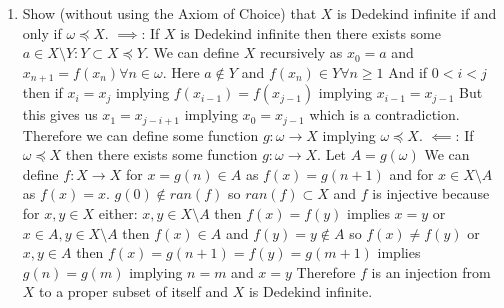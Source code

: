 \documentclass[11pt]{amsart}
\begin{document}
\begin{enumerate}
\begin{enumerate}
\vfill
\item Show (without using the Axiom of Choice) that $X$ is Dedekind infinite if and only if $\omega \preccurlyeq X$.
$\implies$: If $X$ is Dedekind infinite then there exists some $a \in X\setminus Y : Y \subset X \preceq Y$.
We can define $X$ recursively as $x_0 = a$ and $x_{n+1} = f(x_n) \forall n \in \omega$.
Here $a \notin Y$ and $f(x_n) \in Y \forall n \geq 1$
And if $0<i<j$ then if $x_i = x_j$ implying $f(x_{i-1}) = f(x_{j-1})$ implying $x_{i-1} = x_{j-1}$
But this gives us $x_1 = x_{j-i+1}$ implying $x_0 = x_{j-1}$ which is a contradiction.
Therefore we can define some function $g: \omega \rightarrow X$ implying $\omega \preceq X$.
$\impliedby$: If $\omega \preceq X$ then there exists some function $g: \omega \rightarrow X$.
Let $A = g(\omega)$
We can define $f: X \rightarrow X$ for $x = g(n) \in A$ as $f(x) = g(n+1)$ and for $x \in X \setminus A$ as $f(x) = x$.
$g(0) \notin ran(f)$ so $ran(f) \subset X$ and $f$ is injective because for $x,y \in X$ either:
$x,y \in X\setminus A$ then $f(x) = f(y)$ implies $x = y$
or $x \in A, y \in X \setminus A$ then $f(x)\in A$ and $f(y)=y\notin A$ so $f(x) \neq f(y)$
or $x,y \in A$ then $f(x) = g(n+1) = f(y) = g(m+1)$ implies $g(n) = g(m)$ implying $n = m$ and $x = y$
Therefore $f$ is an injection from $X$ to a proper subset of itself and $X$ is Dedekind infinite.
\vfill
\end{enumerate}


\newpage


\end{enumerate}
\end{document}
